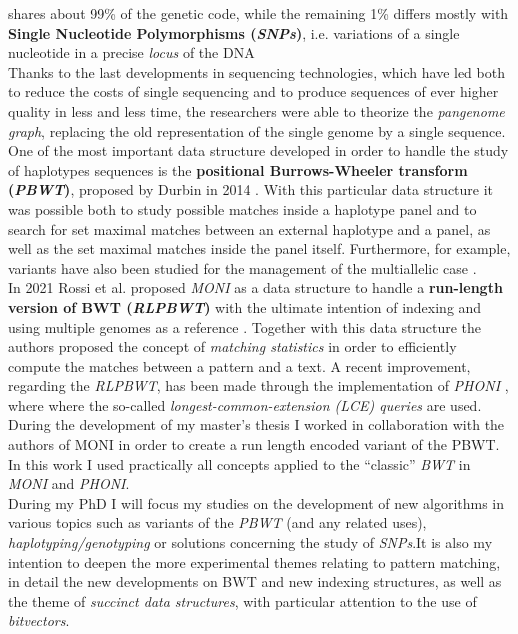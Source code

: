 \documentclass[a4paper,12pt, oneside]{article}
\begin{document}
shares about 99\% of the genetic code, while the remaining 1\% differs mostly
with \textbf{Single Nucleotide Polymorphisms (\textit{SNPs})}, i.e. variations
of a single nucleotide in a precise \textit{locus} of the DNA\\ 
Thanks to the last developments in sequencing technologies, which have led both
to reduce the costs of single sequencing and to produce sequences of ever higher
quality in less and less time, the researchers were able to theorize the
\textit{pangenome graph}, replacing the old representation of the single genome
by a single sequence. \\
One of the most important data structure developed in order to handle the study
of haplotypes sequences is the \textbf{positional Burrows-Wheeler transform
  (\textit{PBWT})}, proposed by Durbin in 2014 \cite{pbwt_durbin}. With this
particular data structure it was possible both to study possible matches inside
a haplotype panel and to search for set maximal matches between an external
haplotype and a panel, as well as the set maximal matches inside the panel
itself. Furthermore, for example, variants have also been studied for the 
management of the multiallelic case \cite{mpbwt}. \\
In 2021 Rossi et al. proposed \textit{MONI} as a data structure to handle a
\textbf{run-length version of BWT (\textit{RLPBWT})} with the ultimate intention
of indexing and using multiple genomes as a reference \cite{moni}. Together with
this data structure the authors proposed the concept of \textit{matching
  statistics} in order to efficiently compute the matches between a pattern and
a text. A recent improvement, regarding the \textit{RLPBWT}, has been made
through the implementation of \textit{PHONI} \cite{phoni}, where where the
so-called \textit{longest-common-extension (LCE) queries} are used. \\
During the development of my master's thesis I worked in collaboration with the
authors of MONI in order to create a run length encoded variant of the PBWT. In
this work I used practically all concepts applied to the ``classic''
\textit{BWT} in \textit{MONI} and \textit{PHONI}. \\
During my PhD I will focus my studies on the development of new algorithms in
various topics such as variants of the \textit{PBWT} (and any related uses),
\textit{haplotyping/genotyping} or solutions concerning the study of
\textit{SNPs}.It is also my intention to deepen the more experimental themes
relating to pattern matching, in detail the new developments on BWT and new
indexing structures, as well as the theme of \textit{succinct data structures},
with particular attention to the use of \textit{bitvectors}. 
\end{document}
